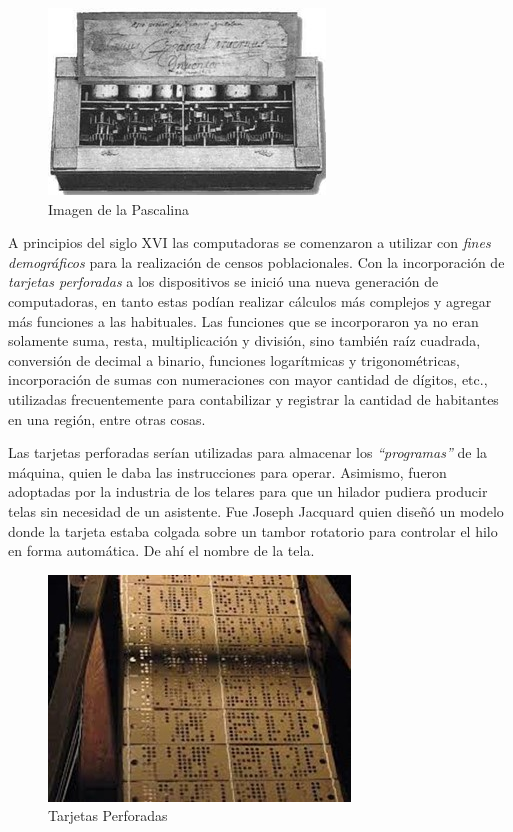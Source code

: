 \documentclass[
  letterpaper,
  DIV=11,
  numbers=noendperiod]{scrreprt}
\begin{document}
\begin{figure}[H]

{\centering \includegraphics{images_2_cap/1-pascalina.jpg}

}

\caption{Imagen de la Pascalina}

\end{figure}%

A principios del siglo XVI las computadoras se comenzaron a utilizar con
\emph{fines demográficos} para la realización de censos poblacionales.
Con la incorporación de \emph{tarjetas perforadas} a los dispositivos se
inició una nueva generación de computadoras, en tanto estas podían
realizar cálculos más complejos y agregar más funciones a las
habituales. Las funciones que se incorporaron ya no eran solamente suma,
resta, multiplicación y división, sino también raíz cuadrada, conversión
de decimal a binario, funciones logarítmicas y trigonométricas,
incorporación de sumas con numeraciones con mayor cantidad de dígitos,
etc., utilizadas frecuentemente para contabilizar y registrar la
cantidad de habitantes en una región, entre otras cosas.

Las tarjetas perforadas serían utilizadas para almacenar los
\emph{``programas''} de la máquina, quien le daba las instrucciones para
operar. Asimismo, fueron adoptadas por la industria de los telares para
que un hilador pudiera producir telas sin necesidad de un asistente. Fue
Joseph Jacquard quien diseñó un modelo donde la tarjeta estaba colgada
sobre un tambor rotatorio para controlar el hilo en forma automática. De
ahí el nombre de la tela.

\begin{figure}[H]

{\centering \includegraphics{images_2_cap/2-tarjetas-perforadas.jpg}

}

\caption{Tarjetas Perforadas}

\end{figure}%
\end{document}
